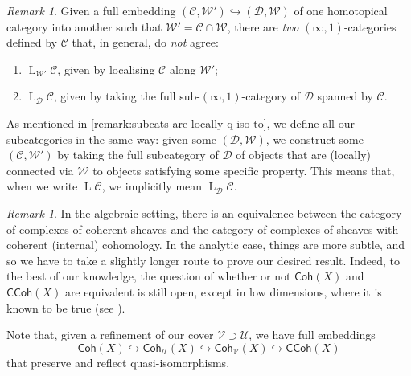 \documentclass[11pt,fleqn]{article}
\theoremstyle{plain}
\theoremstyle{definition}
\theoremstyle{remark}
\newtheorem{remark}[theorem]{Remark}
\numberwithin{equation}{theorem}
\newcommand{\cover}{\mathcal{U}}
\newcommand{\anothercover}{\mathcal{V}}
\newcommand{\gcohX}{\mathsf{Coh}(X)}
\newcommand{\gcohUX}{\mathsf{Coh}_{\cover}(X)}
\newcommand{\gcohVX}{\mathsf{Coh}_{\anothercover}(X)}
\newcommand{\gccohX}{\mathsf{CCoh}(X)}
\DeclareMathOperator{\LL}{L}
\begin{document}
        \begin{remark}
            Given a full embedding $(\mathcal{C},\mathcal{W}')\hookrightarrow(\mathcal{D},\mathcal{W})$ of one homotopical category into another such that $\mathcal{W}'=\mathcal{C}\cap\mathcal{W}$, there are \emph{two} $(\infty,1)$-categories defined by $\mathcal{C}$ that, in general, do \emph{not} agree:
            \begin{enumerate}
                \item $\LL_{\mathcal{W}'}{\mathcal{C}}$, given by localising $\mathcal{C}$ along $\mathcal{W}'$;
                \item $\LL_\mathcal{D}{\mathcal{C}}$, given by taking the full sub-$(\infty,1)$-category of $\mathcal{D}$ spanned by $\mathcal{C}$.
            \end{enumerate}
            As mentioned in \cref{remark:subcats-are-locally-q-iso-to}, we define all our subcategories in the same way: given some $(\mathcal{D},\mathcal{W})$, we construct some $(\mathcal{C},\mathcal{W}')$ by taking the full subcategory of $\mathcal{D}$ of objects that are (locally) connected via $\mathcal{W}$ to objects satisfying some specific property.
            This means that, when we write $\LL{\mathcal{C}}$, we implicitly mean $\LL_\mathcal{D}{\mathcal{C}}$.
        \end{remark}

        \begin{remark}
            In the algebraic setting, there is an equivalence between the category of complexes of coherent sheaves and the category of complexes of sheaves with coherent (internal) cohomology.
            In the analytic case, things are more subtle, and so we have to take a slightly longer route to prove our desired result.
            Indeed, to the best of our knowledge, the question of whether or not $\gcohX$ and $\gccohX$ are equivalent is still open, except in low dimensions, where it is known to be true (see \cite[§2.2.2]{Yu2013}).

            Note that, given a refinement of our cover $\anothercover\supset\cover$, we have full embeddings
            \[
                \gcohX \hookrightarrow \gcohUX \hookrightarrow \gcohVX \hookrightarrow \gccohX
            \]
            that preserve and reflect quasi-isomorphisms.
        \end{remark}
\end{document}
